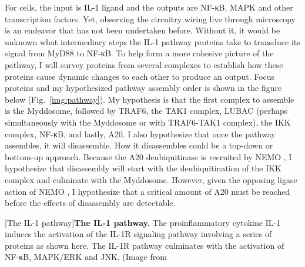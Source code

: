 For cells, the input is IL-1 ligand and the outputs are NF-κB, MAPK and other transcription factors. Yet, observing the circuitry wiring live through microscopy is an endeavor that has not been undertaken before. Without it, it would be unknown what intermediary steps the IL-1 pathway proteins take to transduce its signal from MyD88 to NF-κB. To help form a more cohesive picture of the pathway, I will survey proteins from several complexes to establish how these proteins cause dynamic changes to each other to produce an output. Focus proteins and my hypothesized pathway assembly order is shown in the figure below (Fig.~\ref{img:pathway}). My hypothesis is that the first complex to assemble is the Myddosome, followed by TRAF6, the TAK1 complex, LUBAC (perhaps simultaneously with the Myddosome or with TRAF6-TAK1 complex), the IKK complex, NF-κB, and lastly, A20. I also hypothesize that once the pathway assembles, it will disassemble. How it disassembles could be a top-down or bottom-up approach. Because the A20 deubiquitinase is recruited by NEMO \autocite{Zhang_2000}\autocite{Mauro_2006}, I hypothesize that disassembly will start with the deubiquitination of the IKK complex and culminate with the Myddosome. However, given the opposing ligase action of NEMO \autocite{Laplantine_2009}, I hypothesize that a critical amount of A20 must be reached before the effects of disassembly are detectable.


\begin{centering}
\captionsetup{parbox=none}
[The IL-1 pathway]{\textbf{The IL-1 pathway.} The proinflammatory cytokine IL-1 induces the activation of the IL-1R signaling pathway involving a series of proteins as shown here. The IL-1R pathway culminates with the activation of NF-κB, MAPK/ERK and JNK. (Image from \autocite{Clark_2013}}
\label{img:pathway}
\end{centering}
 
